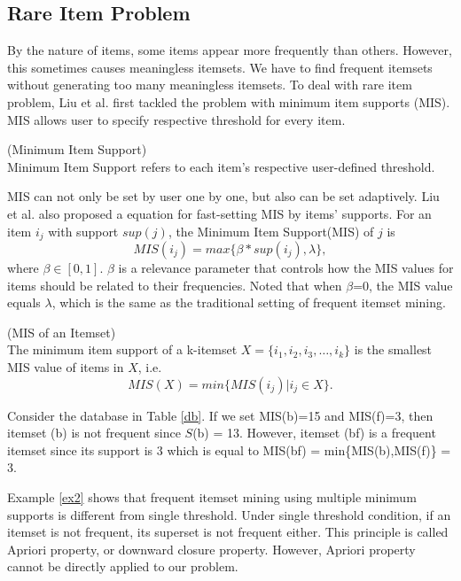 \documentclass[conference]{IEEEtran}
\begin{document}
\subsection{Rare Item Problem}
By the nature of items, some items appear more frequently than others. However, this sometimes causes meaningless itemsets.
We have to find frequent itemsets without generating too many meaningless itemsets.
To deal with rare item problem, Liu et al.\cite{b2} first tackled the problem with minimum item supports (MIS).
MIS allows user to specify respective threshold for every item. 
\begin{definition}{(Minimum Item Support)}\\
Minimum Item Support refers to each item's respective user-defined threshold.
\end{definition}
MIS can not only be set by user one by one, but also can be set adaptively.
Liu et al. also proposed a equation for fast-setting MIS by items' supports.
For an item $i_j$ with support $sup(j)$, the Minimum Item Support(MIS) of $j$ is
\begin{equation} 
MIS(i_j)=max\{\beta*sup(i_j),\lambda\},\label{eq}
\end{equation}
where $\beta\in[0,1]$.
$\beta$ is a relevance parameter that controls how the MIS values for items should be related to their frequencies.
Noted that when $\beta$=0, the MIS value equals $\lambda$, which is the same as the traditional setting of frequent itemset mining.


\begin{definition}{(MIS of an Itemset)}\\
The minimum item support of a k-itemset $X=\{i_1,i_2,i_3,\dots,i_k\}$ is the smallest MIS value of items in $X$, i.e. \\
\begin{equation} 
MIS(X)=min\{MIS(i_j)|i_j\in X\}.\label{eq2}
\end{equation}
\end{definition}

\begin{example}\label{ex2}
Consider the database in Table \ref{db}. 
If we set MIS(b)=15 and MIS(f)=3, then itemset (b) is not frequent since $S$(b) = 13. 
However, itemset (bf) is a frequent itemset since its support is 3 which is equal to MIS(bf) = min\{MIS(b),MIS(f)\} = 3.
\end{example}
Example \ref{ex2} shows that frequent itemset mining using multiple minimum supports is different from single threshold.
Under single threshold condition, if an itemset is not frequent, its superset is not frequent either.
This principle is called Apriori property, or downward closure property. 
However, Apriori property cannot be directly applied to our problem.
\end{document}

